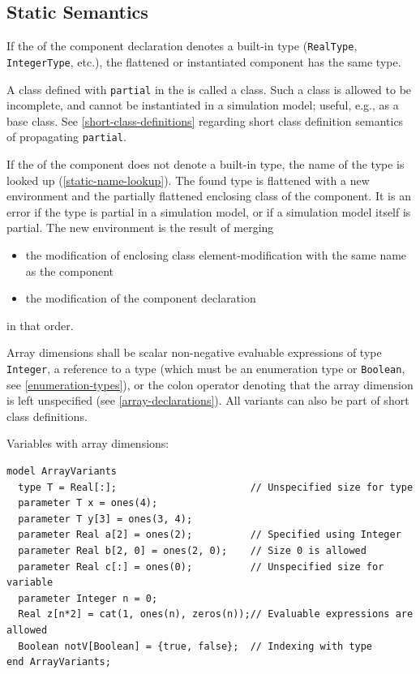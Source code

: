 \subsection{Static Semantics}\label{component-declaration-static-semantics}

If the  of the component declaration denotes a built-in type (\lstinline!RealType!, \lstinline!IntegerType!, etc.), the flattened or instantiated component has the same type.

A class defined with \lstinline!partial! in the  is called a  class.
Such a class is allowed to be incomplete, and cannot be instantiated in a simulation model; useful, e.g., as a base class.
See \cref{short-class-definitions} regarding short class definition semantics of propagating \lstinline!partial!.

If the  of the component does not denote a built-in type, the name of the type is looked up (\cref{static-name-lookup}).
The found type is flattened with a new environment and the partially flattened enclosing class of the component.
It is an error if the type is partial in a simulation model, or if a simulation model itself is partial.
The new environment is the result of merging
\begin{itemize}
\item
  the modification of enclosing class element-modification with the same name as the component
\item
  the modification of the component declaration
\end{itemize}
in that order.

Array dimensions shall be scalar non-negative evaluable expressions of type \lstinline!Integer!, a reference to a type (which must be an enumeration type or \lstinline!Boolean!, see \cref{enumeration-types}), or the colon operator denoting that the array dimension is left unspecified (see \cref{array-declarations}).
All variants can also be part of short class definitions.

\begin{example}
Variables with array dimensions:
\begin{lstlisting}[language=modelica]
model ArrayVariants
  type T = Real[:];                       // Unspecified size for type
  parameter T x = ones(4);
  parameter T y[3] = ones(3, 4);
  parameter Real a[2] = ones(2);          // Specified using Integer
  parameter Real b[2, 0] = ones(2, 0);    // Size 0 is allowed
  parameter Real c[:] = ones(0);          // Unspecified size for variable
  parameter Integer n = 0;
  Real z[n*2] = cat(1, ones(n), zeros(n));// Evaluable expressions are allowed
  Boolean notV[Boolean] = {true, false};  // Indexing with type
end ArrayVariants;
\end{lstlisting}
\end{example}

